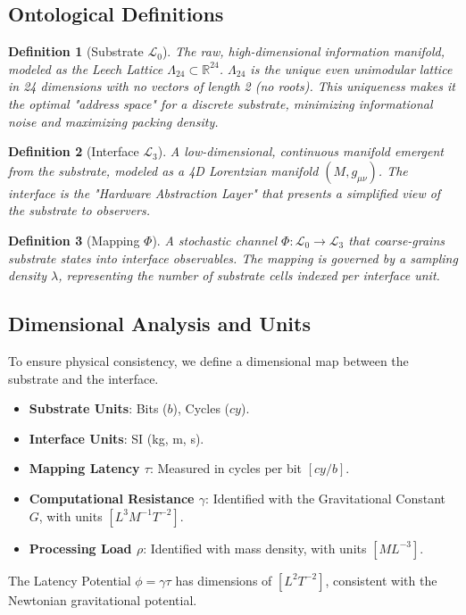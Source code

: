 \documentclass[11pt,titlepage]{article}
\newcommand{\substrate}{\mathcal{L}_0}
\newcommand{\interface}{\mathcal{L}_3}
\newcommand{\leech}{\Lambda_{24}}
\newtheorem{definition}{Definition}[section]
\begin{document}
\subsection{Ontological Definitions}

\begin{definition}[Substrate $\substrate$]
The raw, high-dimensional information manifold, modeled as the Leech Lattice $\leech \subset \mathbb{R}^{24}$. $\leech$ is the unique even unimodular lattice in 24 dimensions with no vectors of length 2 (no roots). This uniqueness makes it the optimal "address space" for a discrete substrate, minimizing informational noise and maximizing packing density.
\end{definition}

\begin{definition}[Interface $\interface$]
A low-dimensional, continuous manifold emergent from the substrate, modeled as a 4D Lorentzian manifold $(M, g_{\mu\nu})$. The interface is the "Hardware Abstraction Layer" that presents a simplified view of the substrate to observers.
\end{definition}

\begin{definition}[Mapping $\Phi$]
A stochastic channel $\Phi: \substrate \to \interface$ that coarse-grains substrate states into interface observables. The mapping is governed by a sampling density $\lambda$, representing the number of substrate cells indexed per interface unit.
\end{definition}

\subsection{Dimensional Analysis and Units}
To ensure physical consistency, we define a dimensional map between the substrate and the interface.
\begin{itemize}
    \item \textbf{Substrate Units}: Bits ($b$), Cycles ($cy$).
    \item \textbf{Interface Units}: SI (kg, m, s).
    \item \textbf{Mapping Latency $\tau$}: Measured in cycles per bit $[cy/b]$.
    \item \textbf{Computational Resistance $\gamma$}: Identified with the Gravitational Constant $G$, with units $[L^3 M^{-1} T^{-2}]$.
    \item \textbf{Processing Load $\rho$}: Identified with mass density, with units $[M L^{-3}]$.
\end{itemize}
The Latency Potential $\phi = \gamma \tau$ has dimensions of $[L^2 T^{-2}]$, consistent with the Newtonian gravitational potential.
\end{document}
